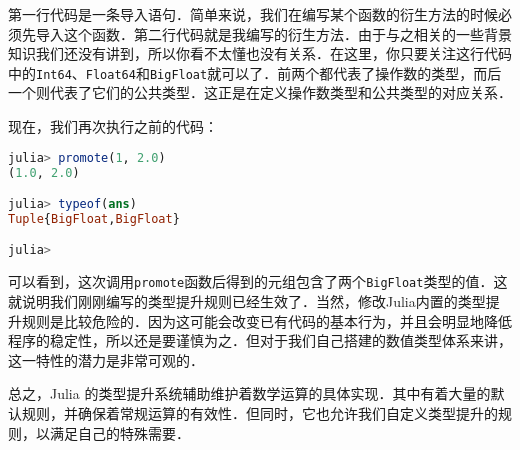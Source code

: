 第一行代码是一条导入语句．简单来说，我们在编写某个函数的衍生方法的时候必须先导入这个函数．第二行代码就是我编写的衍生方法．由于与之相关的一些背景知识我们还没有讲到，所以你看不太懂也没有关系．在这里，你只要关注这行代码中的\verb|Int64|、\verb|Float64|和\verb|BigFloat|就可以了．前两个都代表了操作数的类型，而后一个则代表了它们的公共类型．这正是在定义操作数类型和公共类型的对应关系．

现在，我们再次执行之前的代码：
\begin{lstlisting}[language=julia]
julia> promote(1, 2.0)
(1.0, 2.0)

julia> typeof(ans)
Tuple{BigFloat,BigFloat}

julia> 
\end{lstlisting}

可以看到，这次调用\verb|promote|函数后得到的元组包含了两个\verb|BigFloat|类型的值．这就说明我们刚刚编写的类型提升规则已经生效了．当然，修改Julia内置的类型提升规则是比较危险的．因为这可能会改变已有代码的基本行为，并且会明显地降低程序的稳定性，所以还是要谨慎为之．但对于我们自己搭建的数值类型体系来讲，这一特性的潜力是非常可观的．

总之，Julia 的类型提升系统辅助维护着数学运算的具体实现．其中有着大量的默认规则，并确保着常规运算的有效性．但同时，它也允许我们自定义类型提升的规则，以满足自己的特殊需要．